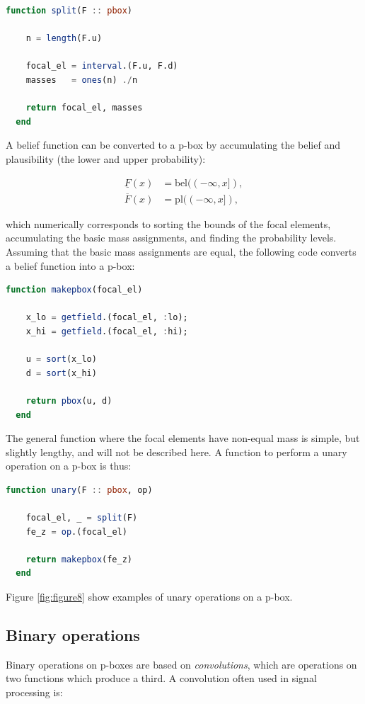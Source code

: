 \documentclass{juliacon}
\begin{document}
\begin{lstlisting}[language = Julia]
  function split(F :: pbox)

    n = length(F.u)

    focal_el = interval.(F.u, F.d)
    masses   = ones(n) ./n

    return focal_el, masses
  end
\end{lstlisting}

A belief function can be converted to a p-box by accumulating the belief and plausibility (the lower and upper probability):

\begin{align*}
  \underline{F}(x) &= \text{bel}((-\infty, x]),\\ 
  \overline{F}(x) &= \text{pl}((-\infty, x]),
\end{align*}

which numerically corresponds to sorting the bounds of the focal elements, accumulating the basic mass assignments, and finding the probability levels. Assuming that the basic mass assignments are equal, the following code converts a belief function into a p-box:

\begin{lstlisting}[language = Julia]
  function makepbox(focal_el)

    x_lo = getfield.(focal_el, :lo);
    x_hi = getfield.(focal_el, :hi);

    u = sort(x_lo)
    d = sort(x_hi)

    return pbox(u, d)
  end
\end{lstlisting}

The general function where the focal elements have non-equal mass is simple, but slightly lengthy, and will not be described here. A function to perform a unary operation on a p-box is thus:

\begin{lstlisting}[language = Julia]
  function unary(F :: pbox, op)

    focal_el, _ = split(F)
    fe_z = op.(focal_el)

    return makepbox(fe_z)
  end
\end{lstlisting}

Figure \ref{fig:figure8} show examples of unary operations on a p-box.

\subsection{Binary operations}
\label{sec:pboxBinary}
Binary operations on p-boxes are based on \textit{convolutions}, which are operations on two functions which produce a third. A convolution often used in signal processing is: 
\end{document}
